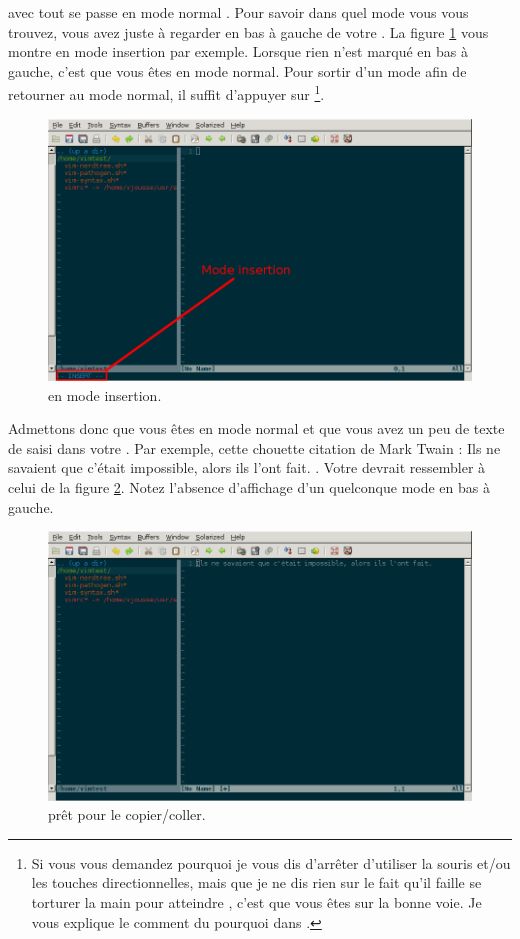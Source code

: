  avec \vim tout se passe en mode \og normal \fg. Pour savoir dans quel mode vous vous trouvez, vous avez juste à regarder en bas à gauche de votre \vim. La figure \ref{fig:insert} vous montre \vim en mode \og insertion \fg{} par exemple. Lorsque rien n'est marqué en bas à gauche, c'est que vous êtes en mode normal. Pour sortir d'un mode afin de retourner au mode normal, il suffit d'appuyer sur \ttesc\footnote{Si vous vous demandez pourquoi je vous dis d'arrêter d'utiliser la souris et/ou les touches directionnelles, mais que je ne dis rien sur le fait qu'il faille se torturer la main pour atteindre \ttesc, c'est que vous êtes sur la bonne voie. Je vous explique le comment du pourquoi dans \og {} \fg.}.

\begin{figure}%
  \includegraphics[width=\linewidth]{graphics/vim-insert.png}
  \caption{\vim en mode insertion.}
  \label{fig:insert}
\end{figure}

Admettons donc que vous êtes en mode \og normal \fg{} et que vous avez un peu de texte de saisi dans votre \vim. Par exemple, cette chouette citation de Mark Twain : \og Ils ne savaient que c'était impossible, alors ils l'ont fait. \fg{}. Votre \vim devrait ressembler à celui de la figure \ref{fig:vim-twain}. Notez l'absence d'affichage d'un quelconque mode en bas à gauche.

\begin{figure}%
  \includegraphics[width=\linewidth]{graphics/vim-twain.png}
  \caption{\vim prêt pour le copier/coller.}
  \label{fig:vim-twain}
\end{figure}

